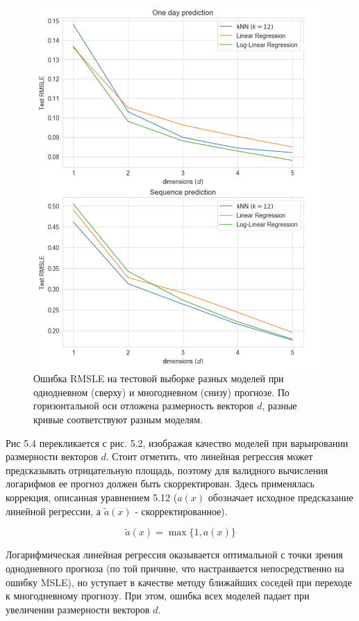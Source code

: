\documentclass[a4paper, 12pt]{article}
\begin{document}
\begin{figure}[H]
    \centering
    \includegraphics[width=11cm]{models_rmsle.png}
    \caption{Ошибка RMSLE на тестовой выборке разных моделей при однодневном (сверху) и многодневном (снизу) прогнозе. По горизонтальной оси отложена размерность векторов $d$, разные кривые соответствуют разным моделям.}
    \label{fig:my_label}
\end{figure}

Рис 5.4 перекликается с рис. 5.2, изображая качество моделей при варьировании размерности векторов $d$. Стоит отметить, что линейная регрессия может предсказывать отрицательную площадь, поэтому для валидного вычисления логарифмов ее прогноз должен быть скорректирован. Здесь применялась коррекция, описанная уравнением 5.12 ($a(x)$ обозначает исходное предсказание линейной регрессии, а $\widetilde{a}(x)$ - скорректированное).

\begin{equation}
    \widetilde{a}(x) = \max\{1, a(x)\}
\end{equation}

Логарифмическая линейная регрессия оказывается оптимальной с точки зрения однодневного прогноза (по той причине, что настраивается непосредственно на ошибку MSLE), но уступает в качестве методу ближайших соседей при переходе к многодневному прогнозу. При этом, ошибка всех моделей падает при увеличении размерности векторов $d$.
\end{document}
